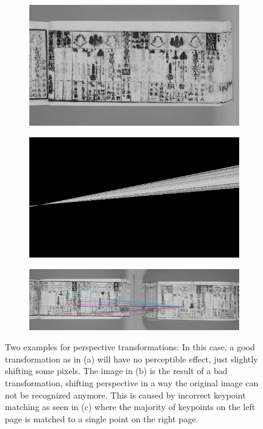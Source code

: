\documentclass{ltjarticle}
\begin{document}
\begin{figure}
    \centering
    \begin{subfigure}{.49\textwidth}
        \includegraphics[width=\textwidth]{homography-good.jpg}
        \caption{}
    \end{subfigure}
    \begin{subfigure}{.49\textwidth}
        \includegraphics[width=\textwidth]{homography-bad.png}
        \caption{}
    \end{subfigure}
    \begin{subfigure}{\textwidth}
        \includegraphics[width=\textwidth]{homography-cause.jpg}
        \caption{}
    \end{subfigure}
    \caption[Perspective transformation examples]{Two examples for perspective transformations: In this case, a good transformation as in (a) will have no perceptible effect, just slightly shifting some pixels. The image in (b) is the result of a bad transformation, shifting perspective in a way the original image can not be recognized anymore. This is caused by incorrect keypoint matching as seen in (c) where the majority of keypoints on the left page is matched to a single point on the right page.}
    \label{fig:homography-compare}
\end{figure}
\end{document}
